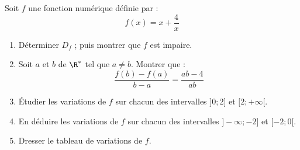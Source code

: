 \begin{Application}[][15 min]
Soit $f$ une fonction numérique définie par :
$$f(x) = x + \frac{4}{x}$$

\begin{enumerate}
    \item Déterminer $D_f$ ; puis montrer que $f$ est impaire.
    \item Soit $a$ et $b$ de $\R^*$ tel que $a \neq b$. 
    Montrer que : 
    $$\frac{f(b) - f(a)}{b - a} = \frac{ab - 4}{ab}$$
    \item Étudier les variations de $f$ sur chacun des intervalles $]0 ; 2]$ et $[2 ; +\infty[$.
    \item En déduire les variations de $f$ sur chacun des intervalles $]-\infty ; -2]$ et $[-2 ; 0[$.
    \item Dresser le tableau de variations de $f$.
\end{enumerate}
\end{Application}
